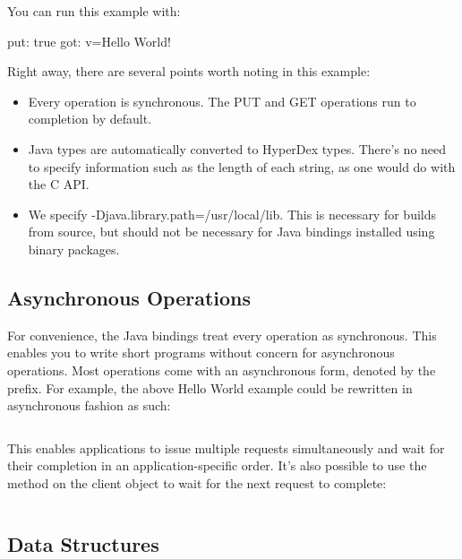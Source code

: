 \inputminted{java}{\topdir/api/java/HelloWorld.java}

You can run this example with:

\begin{consolecode}
put: true
got: {v=Hello World!}
\end{consolecode}

Right away, there are several points worth noting in this example:

\begin{itemize}
\item Every operation is synchronous.  The PUT and GET operations run to
completion by default.

\item Java types are automatically converted to HyperDex types.  There's no need
to specify information such as the length of each string, as one would do with
the C API.

\item We specify -Djava.library.path=/usr/local/lib.  This is necessary for
builds from source, but should not be necessary for Java bindings installed
using binary packages.
\end{itemize}

\subsection{Asynchronous Operations}
\label{sec:api:java:async-ops}

For convenience, the Java bindings treat every operation as synchronous.  This
enables you to write short programs without concern for asynchronous operations.
Most operations come with an asynchronous form, denoted by the 
prefix.  For example, the above Hello World example could be rewritten in
asynchronous fashion as such:

\inputminted{java}{\topdir/api/java/HelloWorldAsyncWait.java}

This enables applications to issue multiple requests simultaneously and wait for
their completion in an application-specific order.  It's also possible to use
the  method on the client object to wait for the next request to
complete:

\inputminted{java}{\topdir/api/java/HelloWorldAsyncLoop.java}

\subsection{Data Structures}
\label{sec:api:java:data-structures}

